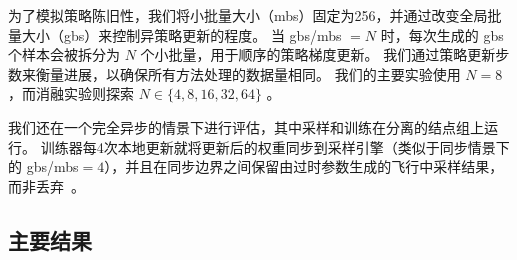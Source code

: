 \documentclass{article}
\theoremstyle{plain}
\theoremstyle{definition}
\theoremstyle{remark}
\begin{document}
为了模拟策略陈旧性，我们将小批量大小（mbs）固定为256，并通过改变全局批量大小（gbs）来控制异策略更新的程度。  
当 gbs/mbs $= N$ 时，每次生成的 gbs 个样本会被拆分为 $N$ 个小批量，用于顺序的策略梯度更新。  
我们通过策略更新步数来衡量进展，以确保所有方法处理的数据量相同。  
我们的主要实验使用 $N = 8$ ，而消融实验则探索 $N \in \{4, 8, 16, 32, 64\}$ 。

我们还在一个完全异步的情景下进行评估，其中采样和训练在分离的结点组上运行。  
训练器每4次本地更新就将更新后的权重同步到采样引擎（类似于同步情景下的 gbs/mbs${=}4$），并且在同步边界之间保留由过时参数生成的飞行中采样结果，而非丢弃~\citep{zhou2025april}。

\subsection{主要结果}
\label{sec:main-results}
\end{document}
